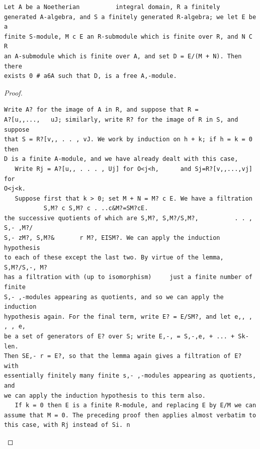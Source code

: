 \begin{theorem}\label{mcrt-auto-theorem-24-2}\uses{}
\begin{verbatim}
Let A be a Noetherian          integral domain, R a finitely
generated A-algebra, and S a finitely generated R-algebra; we let E be a
finite S-module, M c E an R-submodule which is finite over R, and N C R
an A-submodule which is finite over A, and set D = E/(M + N). Then there
exists 0 # a6A such that D, is a free A,-module.
\end{verbatim}
\end{theorem}
\begin{proof}
\begin{verbatim}
Write A? for the image of A in R, and suppose that R =
A?[u,,...,   uJ; similarly, write R? for the image of R in S, and suppose
that S = R?[v,, . . , vJ. We work by induction on h + k; if h = k = 0 then
D is a finite A-module, and we have already dealt with this case,
   Write Rj = A?[u,, . . . , Uj] for O<j<h,      and Sj=R?[v,,...,vj]   for
O<j<k.
   Suppose first that k > 0; set M + N = M? c E. We have a filtration
           S,M? c S,M? c . ..c&M?=SM?cE.
the successive quotients of which are S,M?, S,M?/S,M?,          . . , S,- ,M?/
S,- zM?, S,M?&       r M?, EISM?. We can apply the induction hypothesis
to each of these except the last two. By virtue of the lemma, S,M?/S,-, M?
has a filtration with (up to isomorphism)     just a finite number of finite
S,- ,-modules appearing as quotients, and so we can apply the induction
hypothesis again. For the final term, write E? = E/SM?, and let e,, , , , e,
be a set of generators of E? over S; write E,-, = S,-,e, + ... + Sk-len.
Then SE,- r = E?, so that the lemma again gives a filtration of E? with
essentially finitely many finite s,- ,-modules appearing as quotients, and
we can apply the induction hypothesis to this term also.
   If k = 0 then E is a finite R-module, and replacing E by E/M we can
assume that M = 0. The preceding proof then applies almost verbatim to
this case, with Rj instead of Si. n
\end{verbatim}
\end{proof}


